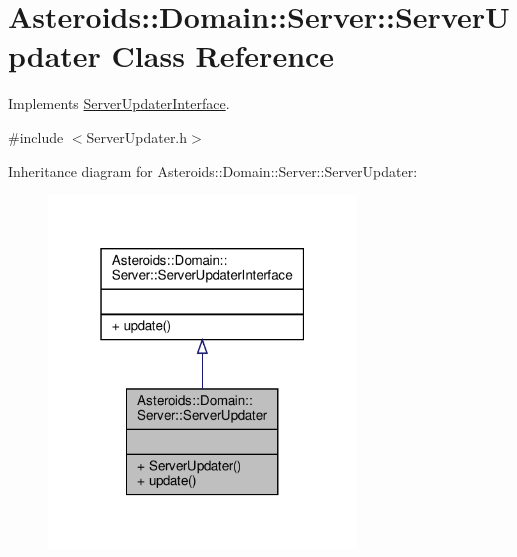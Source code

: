 \hypertarget{classAsteroids_1_1Domain_1_1Server_1_1ServerUpdater}{}\section{Asteroids\+:\+:Domain\+:\+:Server\+:\+:Server\+Updater Class Reference}
\label{classAsteroids_1_1Domain_1_1Server_1_1ServerUpdater}


Implements \hyperlink{classAsteroids_1_1Domain_1_1Server_1_1ServerUpdaterInterface}{Server\+Updater\+Interface}.  




{\ttfamily \#include $<$Server\+Updater.\+h$>$}



Inheritance diagram for Asteroids\+:\+:Domain\+:\+:Server\+:\+:Server\+Updater\+:\nopagebreak
\begin{figure}[H]
\begin{center}
\leavevmode
\includegraphics[width=232pt]{classAsteroids_1_1Domain_1_1Server_1_1ServerUpdater__inherit__graph}
\end{center}
\end{figure}


